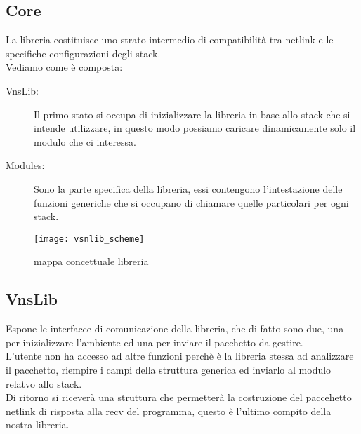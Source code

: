 \subsection{Core}
La libreria costituisce uno strato  intermedio di compatibilit\`a tra netlink e le specifiche configurazioni degli stack.\\
Vediamo come \`e composta:
\begin{description}                     %
  \item[VnsLib:] Il primo stato si occupa di inizializzare la libreria in base allo stack che si intende utilizzare, in questo modo possiamo caricare dinamicamente solo il modulo che ci interessa.
  \item[Modules:] Sono la parte specifica della libreria, essi contengono l'intestazione delle funzioni generiche che si occupano di chiamare quelle particolari per ogni stack.
\end{description}
\begin{figure}[h]                       %
\begin{center}                          %
\texttt{[image: vsnlib\_scheme]}%
%
\caption[mappa concettuale libreria]{mappa concettuale libreria}\label{fig:map}
\end{center}
\end{figure}
\subsection{VnsLib}
Espone le interfacce di comunicazione della libreria, che di fatto sono due, una per inizializzare l'ambiente ed una per inviare il pacchetto da gestire.\\
L'utente non ha accesso ad altre funzioni perch\`e \`e la libreria stessa ad analizzare il pacchetto, riempire i campi della struttura generica ed inviarlo al modulo relatvo allo stack.\\
Di ritorno si ricever\`a una struttura che permetter\`a la costruzione del paccehetto netlink di risposta alla recv del programma, questo \`e l'ultimo compito della nostra libreria.
